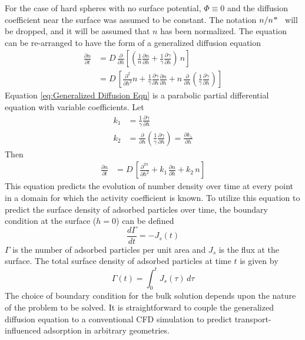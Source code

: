 For the case of hard spheres with no surface potential, $\Phi\equiv0$
and the diffusion coefficient near the surface was assumed to be constant.
The notation \(n  / n^\standardstate\) will be dropped, and it will
be assumed that $n$ has been normalized. The equation can be re-arranged
to have the form of a generalized diffusion equation\begin{align}
\frac{\partial n}{\partial t} & =D\,\frac{\partial}{\partial h}\left[\left(\frac{1}{n}\frac{\partial n}{\partial h}+\frac{1}{\gamma}\frac{\partial\gamma}{\partial h}\right)\, n\right]\nonumber \\
 & =D\,\left[\frac{\partial^{2}}{\partial h^{2}}n+\frac{1}{\gamma}\frac{\partial\gamma}{\partial h}\frac{\partial n}{\partial h}+n\,\frac{\partial}{\partial h}\left(\frac{1}{\gamma}\frac{\partial\gamma}{\partial h}\right)\right]\label{eq:Generalized Diffusion Eqn}\end{align}
Equation \ref{eq:Generalized Diffusion Eqn} is a parabolic partial
differential equation with variable coefficients. Let\begin{align}
k_{1} & =\frac{1}{\gamma}\frac{\partial\gamma}{\partial h}\nonumber \\
k_{2} & =\frac{\partial}{\partial h}\left(\frac{1}{\gamma}\frac{\partial\gamma}{\partial h}\right)=\frac{\partial k_{1}}{\partial h}\label{eq:Variable coefficients}\end{align}
Then\begin{align}
\frac{\partial n}{\partial t} & =D\,\left[\frac{\partial^{2n}}{\partial h^{2}}+k_{1\,}\frac{\partial n}{\partial h}+k_{2}\, n\right]\label{eq:Generalized Diffusion Eqn 1D}\end{align}
 This equation predicts the evolution of number density over time
at every point in a domain for which the activity coefficient is known.
To utilize this equation to predict the surface density of adsorbed
particles over time, the boundary condition at the surface ($h=0$)
can be defined\begin{equation}
\frac{d\Gamma}{dt}=-J_{s}\left(t\right)\label{eq:Flux matching BC}\end{equation}
$\Gamma$ is the number of adsorbed particles per unit area and $J_{s}$
is the flux at the surface. The total surface density of adsorbed
particles at time $t$ is given by\begin{equation}
\Gamma\left(t\right)=\int_{0}^{t}J_{s}\left(\tau\right)\, d\tau\label{eq:Total surface density}\end{equation}
The choice of boundary condition for the bulk solution depends upon
the nature of the problem to be solved. It is straightforward to couple
the generalized diffusion equation to a conventional CFD simulation
to predict transport-influenced adsorption in arbitrary geometries. 


